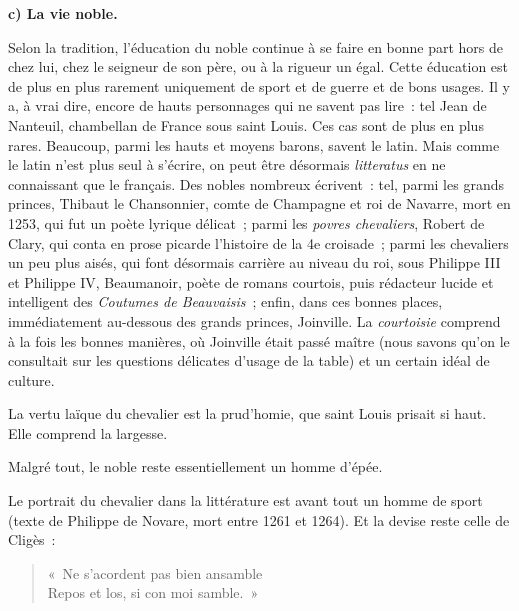\documentclass[french,twoside]{book} %
\newcommand{\labelchar}[1]{\textbf{\color{rubric} #1}}
\begin{document}
\bigbreak
\noindent \labelchar{c) La vie noble.}\par
Selon la tradition, l’éducation du noble continue à se faire en bonne part hors de chez lui, chez le seigneur de son père, ou à la rigueur un égal. Cette éducation est de plus en plus rarement uniquement de sport et de guerre et de bons usages. Il y a, à vrai dire, encore de hauts personnages qui ne savent pas lire : tel Jean de Nanteuil, chambellan de France sous saint Louis. Ces cas sont de plus en plus rares. Beaucoup, parmi les hauts et moyens barons, savent le latin. Mais comme le latin n’est plus seul à s’écrire, on peut être désormais \emph{litteratus} en ne connaissant que le français. Des nobles nombreux écrivent : tel, parmi les grands princes, Thibaut le Chansonnier, comte de Champagne et roi de Navarre, mort en 1253, qui fut un poète lyrique délicat ; parmi les \emph{povres chevaliers}, Robert de Clary, qui conta en prose picarde l’histoire de la 4e croisade ; parmi les chevaliers un peu plus aisés, qui font désormais carrière au niveau du roi, sous Philippe III et Philippe IV, Beaumanoir, poète de romans courtois, puis rédacteur lucide et intelligent des {\itshape Coutumes de Beauvaisis} ; enfin, dans ces bonnes places, immédiatement au-dessous des grands princes, Joinville. La \emph{courtoisie} comprend à la fois les bonnes manières, où Joinville était passé maître (nous savons qu’on le consultait sur les questions délicates d’usage de la table) et un certain idéal de culture.\par
\label{p69} La vertu laïque du chevalier est la prud’homie, que saint Louis prisait si haut. Elle comprend la largesse.\par
Malgré tout, le noble reste essentiellement un homme d’épée.\par
Le portrait du chevalier dans la littérature est avant tout un homme de sport (texte de Philippe de Novare, mort entre 1261 et 1264). Et la devise reste celle de Cligès :\par


\begin{verse}
« Ne s’acordent pas bien ansamble\\
Repos et los, si con moi samble. »\\
\end{verse}
\end{document}

